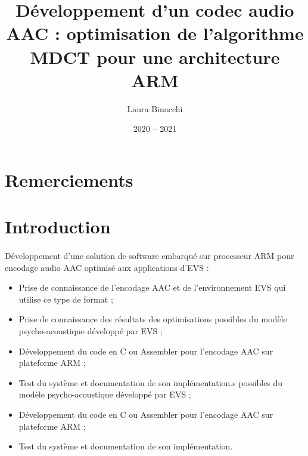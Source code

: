 \documentclass{article}
\title{Développement d'un codec audio AAC : optimisation de l'algorithme MDCT pour une architecture ARM}
\date{2020 -- 2021}
\author{Laura Binacchi}
\begin{document}
    
    \newpage
    \tableofcontents
    \newpage

    \section*{Remerciements}
    \paragraph{}

    \section*{Introduction}


    \paragraph{}
    Développement d'une solution de software embarqué sur processeur ARM pour encodage audio AAC optimisé aux applications d'EVS :
    \begin{itemize}
        \item Prise de connaissance de l'encodage AAC et de l'environnement EVS qui utilise ce type de format ;
        \item Prise de connaissance des résultats des optimisations possibles du modèle psycho-acoustique développé par EVS ;
        \item Développement du code en C ou Assembler pour l'encodage AAC sur plateforme ARM ;
        \item Test du système et documentation de son implémentation.s possibles du modèle psycho-acoustique développé par EVS ;
        \item Développement du code en C ou Assembler pour l'encodage AAC sur plateforme ARM ;
        \item Test du système et documentation de son implémentation.
    \end{itemize}
\end{document}
